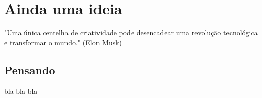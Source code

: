 \chapter{Ainda uma ideia}

\begin{remark}
"Uma única centelha de criatividade pode desencadear uma revolução tecnológica e transformar o mundo." (Elon Musk) 
\end{remark}

\section{Pensando}
bla bla bla

\clearpage